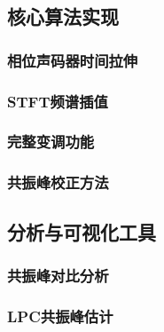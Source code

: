 \documentclass[12pt,a4paper]{article}
\newcommand{\codefolder}{./code}
\begin{document}
\subsection{核心算法实现}
\label{app:core_algorithms}

\subsubsection{相位声码器时间拉伸}


\subsubsection{STFT频谱插值}


\subsubsection{完整变调功能}


\subsubsection{共振峰校正方法}


\subsection{分析与可视化工具}
\label{app:analysis_tools}

\subsubsection{共振峰对比分析}


\subsubsection{LPC共振峰估计}

\end{document}
